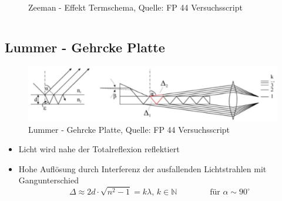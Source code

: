 \begin{myframe}{\subsecname}
\begin{columns}
\begin{column}{0.48\textwidth}
\begin{figure}
                            \caption{Zeeman - Effekt Termschema, Quelle: FP 44 Versuchsscript}
                            \label{zeemanEffektScheme}
                        \end{figure}
                    \end{column}
                \end{columns}

        \end{myframe}



    \subsection{Lummer - Gehrcke Platte}
        \begin{myframe}{\subsecname}
            \begin{figure}
                \includegraphics[width=0.8\linewidth]{img/lummerGehrckePlate.png}
                \caption{Lummer - Gehrcke Platte, Quelle: FP 44 Versuchsscript}
                \label{lummerGehrckePlate}
            \end{figure}
            \begin{itemize}
                \item Licht wird nahe der Totalreflexion reflektiert
                \item Hohe Auflösung durch Interferenz der ausfallenden Lichtstrahlen mit Gangunterschied
                    \begin{equation*}
                        \Delta \approx 2d \cdot \sqrt{n^2 - 1} = k \lambda \text{, } k \in \mathbb{N} \qquad \qquad \text{für } \alpha \sim 90^{\circ}
                    \end{equation*}
            \end{itemize}
        \end{myframe}



